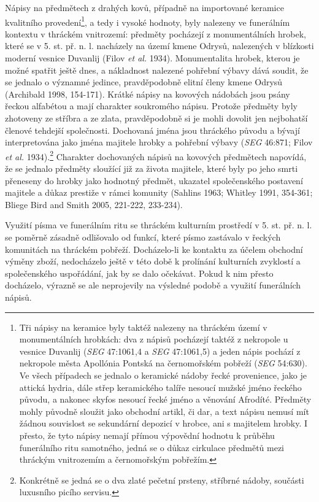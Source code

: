 Nápisy na předmětech z drahých kovů, případně na importované keramice kvalitního provedení\footnote{Tři nápisy na keramice byly taktéž nalezeny na thráckém území v monumentálních hrobkách: dva z nápisů pocházejí taktéž z nekropole u vesnice Duvanlij ({\em SEG} 47:1061,4 a {\em SEG} 47:1061,5) a jeden nápis pochází z nekropole města Apollónia Pontská na černomořském pobřeží ({\em SEG} 54:630). Ve všech případech se jednalo o keramické nádoby řecké provenience, jako je attická hydria, dále střep keramického talíře nesoucí mužské jméno řeckého původu, a nakonec skyfos nesoucí řecké jméno a věnování Afrodíté. Předměty mohly původně sloužit jako obchodní artikl, či dar, a text nápisu nemusí mít žádnou souvislost se sekundární depozicí v hrobce, ani s majitelem hrobky. I přesto, že tyto nápisy nemají přímou výpovědní hodnotu k průběhu funerálního ritu samotného, jedná se o důkaz cirkulace předmětů mezi thráckým vnitrozemím a černomořským pobřežím.}, a tedy i vysoké hodnoty, byly nalezeny ve funerálním kontextu v thráckém vnitrozemí: předměty pocházejí z monumentálních hrobek, které se v 5. st. př. n. l. nacházely na území kmene Odrysů, nalezených v blízkosti moderní vesnice Duvanlij (Filov {\em et al.} 1934). Monumentalita hrobek, kterou je možné spatřit ještě dnes, a nákladnost nalezené pohřební výbavy dává soudit, že se jednalo o významné jedince, pravděpodobně elitní členy kmene Odrysů (Archibald 1998, 154-171). Krátké nápisy na kovových nádobách jsou psány řeckou alfabétou a mají charakter soukromého nápisu. Protože předměty byly zhotoveny ze stříbra a ze zlata, pravděpodobně si je mohli dovolit jen nejbohatší členové tehdejší společnosti. Dochovaná jména jsou thráckého původu a bývají interpretována jako jména majitele hrobky a pohřební výbavy ({\em SEG} 46:871; Filov {\em et al.} 1934).\footnote{Konkrétně se jedná se o dva zlaté pečetní prsteny, stříbrné nádoby, součásti luxusního picího servisu.} Charakter dochovaných nápisů na kovových předmětech napovídá, že se jednalo předměty sloužící již za života majitele, které byly po jeho smrti přeneseny do hrobky jako hodnotný předmět, ukazatel společenského postavení majitele a důkaz prestiže v rámci komunity (Sahlins 1963; Whitley 1991, 354-361; Bliege Bird and Smith 2005, 221-222, 233-234).

Využití písma ve funerálním ritu se thráckém kulturním prostředí v 5. st. př. n. l. se poměrně zásadně odlišovalo od funkcí, které písmo zastávalo v řeckých komunitách na thráckém pobřeží. Docházelo-li ke kontaktu za účelem obchodní výměny zboží, nedocházelo ještě v této době k prolínání kulturních zvyklostí a společenského uspořádání, jak by se dalo očekávat. Pokud k nim přesto docházelo, výrazně se ale neprojevily na výsledné podobě a využití funerálních nápisů.

